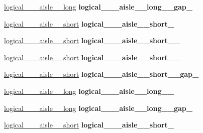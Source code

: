 \begin{DoxyCompactItemize}
\hyperlink{structPresetLocation}{logical\+\_\+\_\+\_\+aisle\+\_\+\_\+long} {\bfseries logical\+\_\+\_\+\_\+aisle\+\_\+\_\+long\+\_\+\_\+gap\+\_\+}
\item 
\mbox{\label{classGantryControl_a4337c531ce39fb27c54b83ad66d19823}} 
\hyperlink{structPresetLocation}{logical\+\_\+\_\+\_\+aisle\+\_\+\_\+short} {\bfseries logical\+\_\+\_\+\_\+aisle\+\_\+\_\+short\+\_\+}
\item 
\mbox{\label{classGantryControl_a8b0cbcd5147ca3b94273d51a93fb546d}} 
\hyperlink{structPresetLocation}{logical\+\_\+\_\+\_\+aisle\+\_\+\_\+short} {\bfseries logical\+\_\+\_\+\_\+aisle\+\_\+\_\+short\+\_\+\_\+}
\item 
\mbox{\label{classGantryControl_a110b0d93381ed278a6000e44c2cf279d}} 
\hyperlink{structPresetLocation}{logical\+\_\+\_\+\_\+aisle\+\_\+\_\+short} {\bfseries logical\+\_\+\_\+\_\+aisle\+\_\+\_\+short\+\_\+\_\+}
\item 
\mbox{\label{classGantryControl_ad190adf2b6f90f369d711f6665d29d57}} 
\hyperlink{structPresetLocation}{logical\+\_\+\_\+\_\+aisle\+\_\+\_\+short} {\bfseries logical\+\_\+\_\+\_\+aisle\+\_\+\_\+short\+\_\+\_\+gap\+\_\+}
\item 
\mbox{\label{classGantryControl_a519b1491016f5ff5a5406b2c453317a9}} 
\hyperlink{structPresetLocation}{logical\+\_\+\_\+\_\+aisle\+\_\+\_\+long} {\bfseries logical\+\_\+\_\+\_\+aisle\+\_\+\_\+long\+\_\+\_\+}
\item 
\mbox{\label{classGantryControl_abc7c32852610806f82bacbc4aa123c46}} 
\hyperlink{structPresetLocation}{logical\+\_\+\_\+\_\+aisle\+\_\+\_\+long} {\bfseries logical\+\_\+\_\+\_\+aisle\+\_\+\_\+long\+\_\+\_\+gap\+\_\+}
\item 
\mbox{\label{classGantryControl_addc22b63dae33f89d97d73cb8b688fa5}} 
\hyperlink{structPresetLocation}{logical\+\_\+\_\+\_\+aisle\+\_\+\_\+short} {\bfseries logical\+\_\+\_\+\_\+aisle\+\_\+\_\+short\+\_\+}

\end{DoxyCompactItemize}
